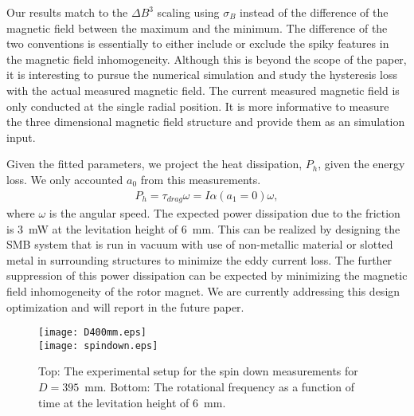 \documentclass[journal]{IEEEtran}
\begin{document}
Our results match to the $\Delta B^3$ scaling using $\sigma_B$ instead of the difference of the magnetic field between the maximum and the minimum.
The difference of the two conventions is essentially to either include or exclude the spiky features in the magnetic field inhomogeneity. 
Although this is beyond the scope of the paper, it is interesting to pursue the numerical simulation and study the hysteresis loss with the actual measured magnetic field.
The current measured magnetic field is only conducted at the single radial position. 
It is more informative to measure the three dimensional magnetic field structure and provide them as an simulation input. 

Given the fitted parameters, we project the heat dissipation, $P_{h}$, given the energy loss.
We only accounted $a_0$ from this measurements.
\begin{eqnarray}
P_{h} = \tau_{drag} \omega = I \alpha(a_1=0) \omega,
\label{eq:energyloss}
\end{eqnarray}
where $\omega$ is the angular speed.
The expected power dissipation due to the friction is 3~mW at the levitation height of 6~mm.
This can be realized by designing the SMB system that is run in vacuum with use of non-metallic material or slotted metal in surrounding structures to minimize the eddy current loss.
The further suppression of this power dissipation can be expected by minimizing the magnetic field inhomogeneity of the rotor magnet.
We are currently addressing this design optimization and will report in the future paper.

\begin{figure}[htb]
   \centering
   \texttt{[image: D400mm.eps]} \\
   \vspace{3mm}
   \texttt{[image: spindown.eps]}
   \caption{Top: The experimental setup for the spin down measurements for $D=395$~mm. Bottom: The rotational frequency as a function of time at the levitation height of 6~mm.}
   \label{fig:spindown}
\end{figure}
\end{document}
